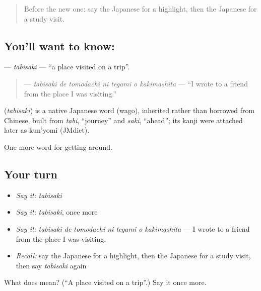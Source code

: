 \begin{quote}
Before the new one: say the Japanese for a highlight, then the Japanese for a study visit.
\end{quote}

\subsection*{You'll want to know: }
\textbf{} — \emph{tabisaki} — \textquotedblleft{}a place visited on a trip\textquotedblright{}.

\begin{quote}
\textbf{   } — \emph{tabisaki de tomodachi ni tegami o kakimashita} — \textquotedblleft{}I wrote to a friend from the place I was visiting.\textquotedblright{}
\end{quote}

\begin{cousinweb}
\textbf{} (\emph{tabisaki}) is a native Japanese word (wago), inherited rather than borrowed from Chinese, built from \emph{tabi}, \textquotedblleft{}journey\textquotedblright{} and \emph{saki}, \textquotedblleft{}ahead\textquotedblright{}; its kanji were attached later as kun'yomi (JMdict).
\end{cousinweb}

\begin{grammarlens}[title={What you've built}]
One more word for getting around.
\end{grammarlens}

\subsection*{Your turn}
\begin{itemize}
\raggedright
  \item \emph{Say it:} \emph{tabisaki}
  \item \emph{Say it:} \emph{tabisaki}, once more
  \item \emph{Say it:} \emph{tabisaki de tomodachi ni tegami o kakimashita} — I wrote to a friend from the place I was visiting.
  \item \emph{Recall:} say the Japanese for a highlight, then the Japanese for a study visit, then say \emph{tabisaki} again
\end{itemize}

\begin{tcolorbox}[breakable,colback=teal!4,colframe=teal!35!black,title={Before you move on}]
What does  mean? (\textquotedblleft{}A place visited on a trip\textquotedblright{}.) Say it once more.
\end{tcolorbox}
